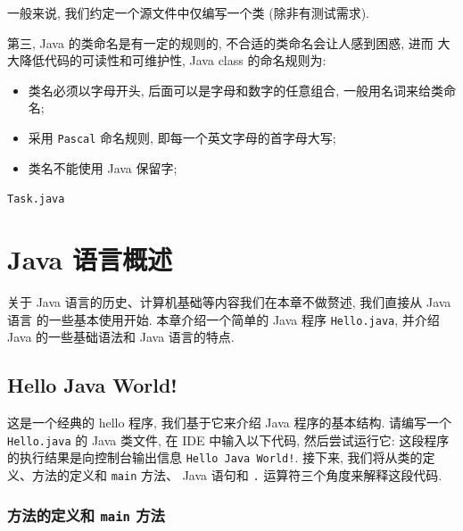 \documentclass[10pt,UTF8]{book} %
\begin{document}
一般来说, 我们约定一个源文件中仅编写一个类 (除非有测试需求).

第三, Java 的类命名是有一定的规则的, 不合适的类命名会让人感到困惑, 进而
大大降低代码的可读性和可维护性, Java class 的命名规则为:
\begin{itemize}[itemsep = 0pt]
    \item 类名必须以字母开头, 后面可以是字母和数字的任意组合, 一般用名词来给类命名;
    \item 采用 \lstinline|Pascal| 命名规则, 即每一个英文字母的首字母大写;
    \item 类名不能使用 Java 保留字;
\end{itemize}


\begin{code}
    \lstinline|Task.java|
    
\end{code}
\chapter{Java 语言概述}

\quad\quad 关于 Java 语言的历史、计算机基础等内容我们在本章不做赘述, 我们直接从 Java 语言
的一些基本使用开始. 本章介绍一个简单的 Java 程序 \lstinline|Hello.java|, 并介绍 Java
的一些基础语法和 Java 语言的特点.

\section{Hello Java World!}


\begin{example}
    \label{helloJavaWorld}
    这是一个经典的 hello 程序, 我们基于它来介绍 Java 程序的基本结构. 请编写一个
    \lstinline|Hello.java| 的 Java 类文件, 在 IDE 中输入以下代码, 然后尝试运行它:
    这段程序的执行结果是向控制台输出信息 \lstinline|Hello Java World!|.
    接下来, 我们将从类的定义、方法的定义和 \lstinline|main| 方法、
    Java 语句和 \lstinline|.| 运算符三个角度来解释这段代码.
\end{example}



\subsection{方法的定义和 \lstinline|main| 方法}
\end{document}
